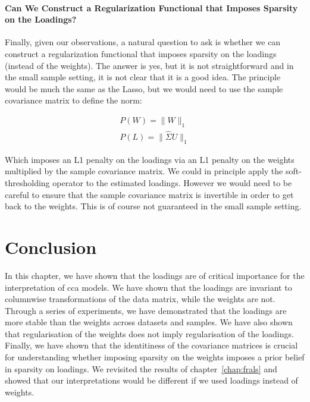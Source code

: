 \paragraph{Can We Construct a Regularization Functional that Imposes Sparsity on the Loadings?}
Finally, given our observations, a natural question to ask is whether we can construct a regularization functional that imposes sparsity on the \gls{loadings} (instead of the weights).
The answer is yes, but it is not straightforward and in the small sample setting, it is not clear that it is a good idea.
The principle would be much the same as the Lasso, but we would need to use the sample covariance matrix to define the norm:

\begin{align}
    P(W)=\|W\|_1 \\
    P(L)=\|\hat{\Sigma}U\|_1
\end{align}

Which imposes an L1 penalty on the \gls{loadings} via an L1 penalty on the \gls{weights} multiplied by the sample covariance matrix.
We could in principle apply the soft-thresholding operator to the estimated loadings.
However we would need to be careful to ensure that the sample covariance matrix is invertible in order to get back to the weights.
This is of course not guaranteed in the small sample setting.

\section{Conclusion}

In this chapter, we have shown that the \gls{loadings} are of critical importance for the interpretation of \acrshort{cca} models.
We have shown that the \gls{loadings} are invariant to columnwise transformations of the data matrix, while the \gls{weights} are not.
Through a series of experiments, we have demonstrated that the \gls{loadings} are more stable than the \gls{weights} across datasets and samples.
We have also shown that regularisation of the \gls{weights} does not imply regularisation of the \gls{loadings}.
Finally, we have shown that the identitiness of the covariance matrices is crucial for understanding whether imposing sparsity on the \gls{weights} imposes a prior belief in sparsity on loadings.
We revisited the results of chapter~\ref{chap:frals} and showed that our interpretations would be different if we used \gls{loadings} instead of \gls{weights}.